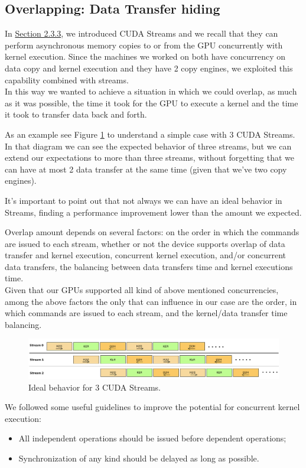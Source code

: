 	
	\subsection{Overlapping: Data Transfer hiding}
	In \hyperref[subs:stream]{Section 2.3.3}, we introduced CUDA Streams and we recall that they can perform asynchronous memory copies to or from the GPU	concurrently with kernel execution. 
	Since the machines we worked on both have concurrency on data copy and kernel execution and they have 2 copy engines, we exploited this capability combined with streams.\\
	In this way we wanted to achieve a situation in which we could overlap, as much as it was possible, the time it took for the GPU to execute a kernel and the time it took to transfer data back and forth.
	
	As an example see Figure \ref{fig:threeStreams} to understand a simple case with 3 CUDA Streams.
	In that diagram we can see the expected behavior of three streams, but we can extend our expectations to more than three streams, without forgetting that we can have at most 2 data transfer at the same time (given that we've two copy engines).
	
	It's important to point out that not always we can have an ideal behavior in Streams, finding a performance improvement lower than the amount we expected.
	
	Overlap amount depends on several factors: on the order in which the commands are issued to each stream, whether or not the device supports overlap of data transfer and kernel execution, concurrent kernel execution, and/or concurrent data transfers, the balancing between data transfers time and kernel executions time.\\
	Given that our GPUs supported all kind of above mentioned concurrencies, among the above factors the only that can influence in our case are the order, in which commands are issued to each stream, and the kernel/data transfer time balancing.\\
	\begin{figure}
		\includegraphics[width=\linewidth]{images/3Streams.png}
		\caption{Ideal behavior for 3 CUDA Streams.}
		\label{fig:threeStreams}
	\end{figure}
	We followed some useful guidelines to improve the potential for concurrent kernel execution:
	\begin{itemize}
		\item All independent operations should be issued before dependent operations;
		\item Synchronization of any kind should be delayed as long as possible.
	\end{itemize}

